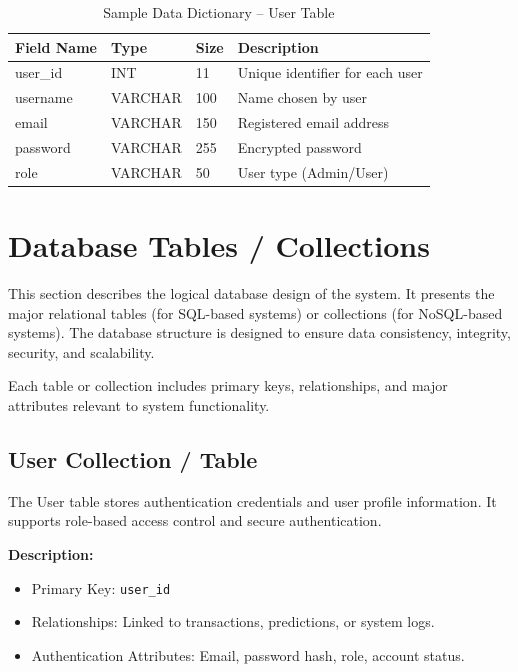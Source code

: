 \begin{table}[h]
\centering
\caption{Sample Data Dictionary – User Table}
\begin{tabularx}{\textwidth}{|p{3cm}|p{2cm}|p{2cm}|X|}
\hline
\textbf{Field Name} & \textbf{Type} & \textbf{Size} & \textbf{Description} \\
\hline
user\_id & INT & 11 & Unique identifier for each user \\
\hline
username & VARCHAR & 100 & Name chosen by user \\
\hline
email & VARCHAR & 150 & Registered email address \\
\hline
password & VARCHAR & 255 & Encrypted password \\
\hline
role & VARCHAR & 50 & User type (Admin/User) \\
\hline
\end{tabularx}
\end{table}

\section{Database Tables / Collections}

This section describes the logical database design of the system. It presents the major relational tables (for SQL-based systems) or collections (for NoSQL-based systems). The database structure is designed to ensure data consistency, integrity, security, and scalability.

Each table or collection includes primary keys, relationships, and major attributes relevant to system functionality.



\subsection{User Collection / Table}

The User table stores authentication credentials and user profile information. It supports role-based access control and secure authentication.

\textbf{Description:}
\begin{itemize}
    \item Primary Key: \texttt{user\_id}
    \item Relationships: Linked to transactions, predictions, or system logs.
    \item Authentication Attributes: Email, password hash, role, account status.
\end{itemize}

